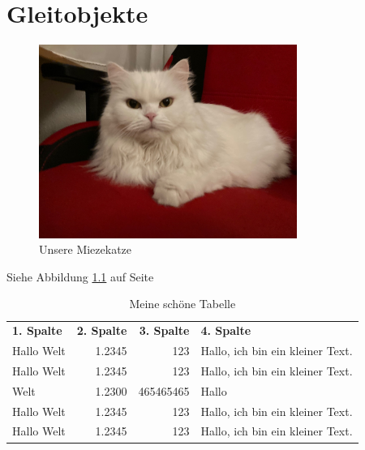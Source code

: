 \documentclass[12pt,ngerman,parskip=half]{scrreprt} %
\begin{document}
\chapter{Gleitobjekte}

\blindtext

\blindtext


\begin{figure}[h] %
\begin{center}
\includegraphics[width=0.75\textwidth]{./Bilder/Katze/Katze2.jpg}
\caption{Unsere Miezekatze}\label{fig:katze}
\end{center}
\end{figure}

Siehe Abbildung \ref{fig:katze}  auf Seite \pageref{fig:katze}

\blindtext

\blindtext

\blindtext

\begin{table}
\begin{center}
\caption{Meine schöne Tabelle}\label{tab:nice}
\begin{tabular}{lrrp{60mm}} \toprule[2pt]
\textbf{1. Spalte} & \textbf{2. Spalte} & \textbf{3. Spalte} & \textbf{4. Spalte} \\ \cmidrule[1pt](rl){1-4}
Hallo Welt & 1.2345 & 123 & Hallo, ich bin ein kleiner Text. \\ 
Hallo Welt & 1.2345 & 123 & Hallo, ich bin ein kleiner Text. \\ 
Welt & 1.2300 & 465465465 & Hallo \\ 
Hallo Welt & 1.2345 & 123 & Hallo, ich bin ein kleiner Text. \\ 
Hallo Welt & 1.2345 & 123 & Hallo, ich bin ein kleiner Text. \\ \bottomrule
\end{tabular}
\end{center}
\end{table}
\end{document}
